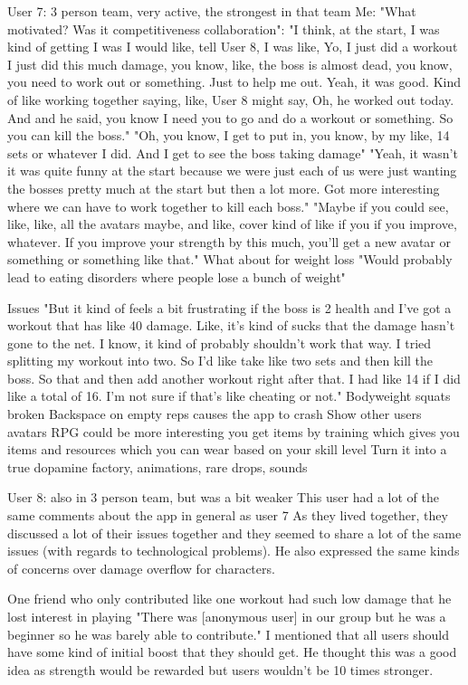 \documentclass{l4proj}
\begin{document}
User 7: 3 person team, very active, the strongest in that team  
  Me: "What motivated? Was it competitiveness collaboration":
  "I think, at the start, I was kind of getting I was I would like, tell User 8, I was like, Yo, I just did a workout I just did this much damage, you know, like, the boss is almost dead, you know, you need to work out or something. Just to help me out. Yeah, it was good. Kind of like working together saying, like, User 8 might say, Oh, he worked out today. And and he said, you know I need you to go and do a workout or something. So you can kill the boss."
  "Oh, you know, I get to put in, you know, by my like, 14 sets or whatever I did. And I get to see the boss taking damage"
  "Yeah, it wasn't it was quite funny at the start because we were just each of us were just wanting the bosses pretty much at the start but then a lot more. Got more interesting where we can have to work together to kill each boss."
  "Maybe if you could see, like, like, all the avatars maybe, and like, cover kind of like if you if you improve, whatever. If you improve your strength by this much, you'll get a new avatar or something or something like that."
  What about for weight loss
    "Would probably lead to eating disorders where people lose a bunch of weight"

  Issues
    "But it kind of feels a bit frustrating if the boss is 2 health and I've got a workout that has like 40 damage. Like, it's kind of sucks that the damage hasn't gone to the net. I know, it kind of probably shouldn't work that way. I tried splitting my workout into two. So I'd like take like two sets and then kill the boss. So that and then add another workout right after that. I had like 14 if I did like a total of 16. I'm not sure if that's like cheating or not."
    Bodyweight squats broken
    Backspace on empty reps causes the app to crash
    Show other users avatars
    RPG could be more interesting you get items by training which gives you items and resources which you can wear based on your skill level
    Turn it into a true dopamine factory, animations, rare drops, sounds

User 8: also in 3 person team, but was a bit weaker
  This user had a lot of the same comments about the app in general as user 7
  As they lived together, they discussed a lot of their issues together and they seemed to share a lot of the same issues (with regards to technological problems). He also expressed the same kinds of concerns over damage overflow for characters.


  One friend who only contributed like one workout had such low damage that he lost interest in playing
    "There was [anonymous user] in our group but he was a beginner so he was barely able to contribute."
      I mentioned that all users should have some kind of initial boost that they should get. He thought this was a good idea as strength would be rewarded but users wouldn't be 10 times stronger.
\end{document}
